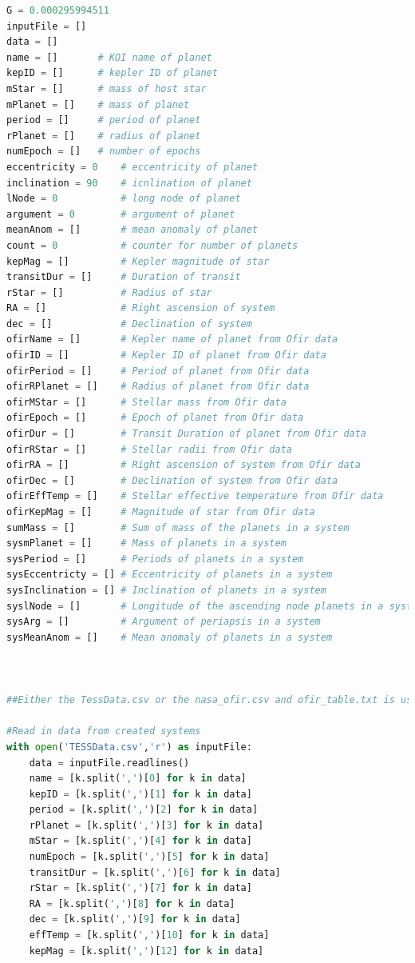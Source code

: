 \documentclass[12pt]{report}
\begin{document}
\begin{appendix}
\begin{lstlisting}[language=Python]
G = 0.000295994511
inputFile = []
data = []
name = [] 		# KOI name of planet
kepID = [] 		# kepler ID of planet
mStar = [] 		# mass of host star
mPlanet = [] 	# mass of planet
period = []		# period of planet
rPlanet = []	# radius of planet
numEpoch = []	# number of epochs
eccentricity = 0	# eccentricity of planet
inclination = 90	# icnlination of planet
lNode = 0			# long node of planet
argument = 0		# argument of planet
meanAnom = []		# mean anomaly of planet
count = 0			# counter for number of planets
kepMag = []			# Kepler magnitude of star
transitDur = []		# Duration of transit
rStar = []			# Radius of star
RA = []				# Right ascension of system
dec = []			# Declination of system
ofirName = []		# Kepler name of planet from Ofir data
ofirID = []			# Kepler ID of planet from Ofir data
ofirPeriod = []		# Period of planet from Ofir data
ofirRPlanet = []	# Radius of planet from Ofir data
ofirMStar = []		# Stellar mass from Ofir data
ofirEpoch = []		# Epoch of planet from Ofir data
ofirDur = []		# Transit Duration of planet from Ofir data
ofirRStar = []		# Stellar radii from Ofir data
ofirRA = []			# Right ascension of system from Ofir data
ofirDec = []		# Declination of system from Ofir data
ofirEffTemp = []	# Stellar effective temperature from Ofir data
ofirKepMag = []		# Magnitude of star from Ofir data
sumMass = []		# Sum of mass of the planets in a system
sysmPlanet = []		# Mass of planets in a system
sysPeriod = []		# Periods of planets in a system
sysEccentricty = []	# Eccentricity of planets in a system
sysInclination = []	# Inclination of planets in a system
syslNode = []		# Longitude of the ascending node planets in a system
sysArg = []			# Argument of periapsis in a system
sysMeanAnom = []	# Mean anomaly of planets in a system



##Either the TessData.csv or the nasa_ofir.csv and ofir_table.txt is used. They are not used together	
	
#Read in data from created systems
with open('TESSData.csv','r') as inputFile: 
	data = inputFile.readlines()
	name = [k.split(',')[0] for k in data]
	kepID = [k.split(',')[1] for k in data]
	period = [k.split(',')[2] for k in data]
	rPlanet = [k.split(',')[3] for k in data]
	mStar = [k.split(',')[4] for k in data]
	numEpoch = [k.split(',')[5] for k in data]
	transitDur = [k.split(',')[6] for k in data]
	rStar = [k.split(',')[7] for k in data]
	RA = [k.split(',')[8] for k in data]
	dec = [k.split(',')[9] for k in data]
	effTemp = [k.split(',')[10] for k in data]
	kepMag = [k.split(',')[12] for k in data]
	

\end{lstlisting}
\end{appendix}
\end{document}
